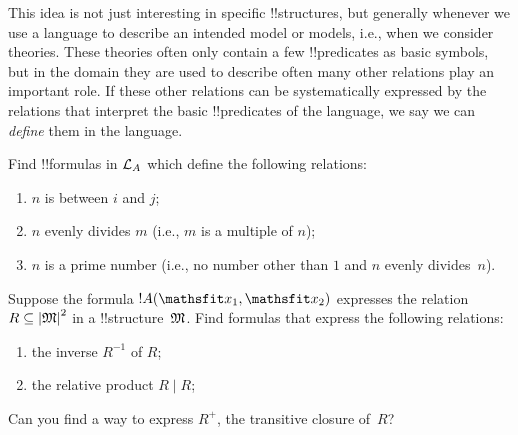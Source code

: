 \documentclass[../../include/open-logic-section]{subfiles}
\begin{document}
This idea is not just interesting in specific !!{structure}s, but
generally whenever we use a language to describe an intended model or
models, i.e., when we consider theories.  These theories often only
contain a few !!{predicate}s as basic symbols, but in the domain they
are used to describe often many other relations play an important
role.  If these other relations can be systematically expressed by the
relations that interpret the basic !!{predicate}s of the language, we
say we can \emph{define} them in the language.

\begin{prob}
Find !!{formula}s in $\mathcal L_A$ which define the following relations:
\begin{enumerate}
\item $n$ is between $i$ and $j$;
\item $n$ evenly divides $m$ (i.e., $m$ is a multiple of $n$);
\item $n$ is a prime number (i.e., no number other than $1$ and $n$ evenly
  divides~$n$).
\end{enumerate}
\end{prob}

\begin{prob}
Suppose the formula $!A(\Obj x_1, \Obj x_2)$ expresses the relation $R
\subseteq \left| \mathfrak M \right|^2$ in a !!{structure}~$\mathfrak M$.  Find formulas
that express the following relations:
\begin{enumerate}
\item the inverse $R^{-1}$ of $R$;
\item the relative product $R \mid R$;
\end{enumerate}
Can you find a way to express $R^+$, the transitive closure of~$R$?
\end{prob}
\end{document}
